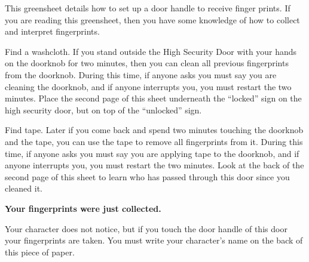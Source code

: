 \documentclass[green]{guildcamp1}
\begin{document}
\name{\gFingerprint{}}

This greensheet details how to set up a door handle to receive finger prints. If you are reading this greensheet, then you have some knowledge of how to collect and interpret fingerprints.

Find a washcloth.  If you stand outside the High Security Door with your hands on the doorknob for two minutes, then you can clean all previous fingerprints from the doorknob.  During this time, if anyone asks you must say you are cleaning the doorknob, and if anyone interrupts you, you must restart the two minutes.  Place the second page of this sheet underneath the ``locked'' sign on the high security door, but on top of the ``unlocked'' sign. 

Find tape.  Later if you come back and spend two minutes touching the doorknob and the tape, you can use the tape to remove all fingerprints from it.  During this time, if anyone asks you must say you are applying tape to the doorknob, and if anyone interrupts you, you must restart the two minutes.  Look at the back of the second page of this sheet to learn who has passed through this door since you cleaned it.

\newpage
{\bf Your fingerprints were just collected.}

Your character does not notice, but if you touch the door handle of this door your fingerprints are taken. You must write your character's name on the back of this piece of paper.
\end{document}
